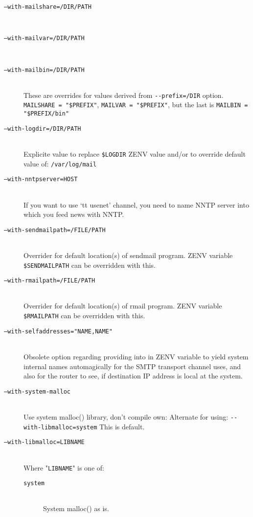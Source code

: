 \begin{description}
\item[\tt ---with-mailshare=/DIR/PATH] \mbox{} \\
\item[\tt ---with-mailvar=/DIR/PATH] \mbox{} \\
\item[\tt ---with-mailbin=/DIR/PATH] \mbox{} \\
These are overrides for values derived from  \verb:--prefix=/DIR:
option.  {\tt MAILSHARE = "\$PREFIX"}, {\tt MAILVAR = "\$PREFIX"},
but the last is {\tt MAILBIN = "\$PREFIX/bin"}

\item[\tt ---with-logdir=/DIR/PATH] \mbox{} \\
Explicite value to replace {\tt \$LOGDIR} ZENV value and/or to
override default value of:  {\tt /var/log/mail}

\item[\tt ---with-nntpserver=HOST] \mbox{} \\
If you want to use `{tt usenet}' channel, you need to name
NNTP server into which you feed news with NNTP.

\item[\tt ---with-sendmailpath=/FILE/PATH] \mbox{} \\
Overrider for default location(s) of sendmail program.
ZENV variable \verb:$SENDMAILPATH: can be overridden with this.

\item[\tt ---with-rmailpath=/FILE/PATH] \mbox{} \\
Overrider for default location(s) of rmail program.
ZENV variable \verb:$RMAILPATH: can be overridden with this.

\item[\tt ---with-selfaddresses="NAME,NAME"] \mbox{} \\
Obsolete option regarding providing into in ZENV variable
to yield system internal names automagically for the SMTP
transport channel uses, and also for the router to see,
if destination IP address is local at the system.

\item[\tt ---with-system-malloc] \mbox{} \\
Use system malloc() library, don't compile own:
Alternate for using: \verb:--with-libmalloc=system:
This is default.

\item[\tt ---with-libmalloc=LIBNAME] \mbox{} \\
Where "{\tt LIBNAME}" is one of:
\begin{description}
\item[\tt system] \mbox{} \\
System malloc() as is.


\end{description}
\end{description}
